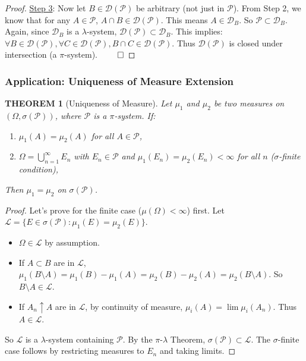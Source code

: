 \documentclass[12pt]{article}
\theoremstyle{blueplain}
\newtheorem{theorem}{THEOREM}[section]
\theoremstyle{bluedef}
\theoremstyle{blueremark}
\numberwithin{equation}{section}
\begin{document}
\begin{proof}
  \underline{Step 3}: Now let $B \in \mathcal{D}(\mathcal{P})$ be arbitrary (not just in $\mathcal{P}$).
  From Step 2, we know that for any $A \in \mathcal{P}$, $A \cap B \in \mathcal{D}(\mathcal{P})$.
  This means $A \in \mathcal{D}_B$. So $\mathcal{P} \subset \mathcal{D}_B$.
  Again, since $\mathcal{D}_B$ is a $\lambda$-system, $\mathcal{D}(\mathcal{P}) \subset \mathcal{D}_B$.
  This implies: $\forall B \in \mathcal{D}(\mathcal{P}), \forall C \in \mathcal{D}(\mathcal{P}), B \cap C \in \mathcal{D}(\mathcal{P})$.
  Thus $\mathcal{D}(\mathcal{P})$ is closed under intersection (a $\pi$-system). $\qed$
\end{proof}

\subsubsection{Application: Uniqueness of Measure Extension}

\begin{theorem}[Uniqueness of Measure]
  Let $\mu_1$ and $\mu_2$ be two measures on $(\Omega, \sigma(\mathcal{P}))$, where $\mathcal{P}$ is a $\pi$-system.
  If:
  \begin{enumerate}
    \item $\mu_1(A) = \mu_2(A)$ for all $A \in \mathcal{P}$,
    \item $\Omega = \bigcup_{n=1}^\infty E_n$ with $E_n \in \mathcal{P}$ and $\mu_1(E_n) = \mu_2(E_n) < \infty$ for all $n$ ($\sigma$-finite condition),
  \end{enumerate}
  Then $\mu_1 = \mu_2$ on $\sigma(\mathcal{P})$.
\end{theorem}

\begin{proof}
  Let's prove for the finite case ($\mu(\Omega) < \infty$) first.
  Let $\mathcal{L} = \{ E \in \sigma(\mathcal{P}) : \mu_1(E) = \mu_2(E) \}$.
  \begin{itemize}
    \item $\Omega \in \mathcal{L}$ by assumption.
    \item If $A \subset B$ are in $\mathcal{L}$, $\mu_1(B \setminus A) = \mu_1(B) - \mu_1(A) = \mu_2(B) - \mu_2(A) = \mu_2(B \setminus A)$. So $B \setminus A \in \mathcal{L}$.
    \item If $A_n \uparrow A$ are in $\mathcal{L}$, by continuity of measure, $\mu_i(A) = \lim \mu_i(A_n)$. Thus $A \in \mathcal{L}$.
  \end{itemize}
  So $\mathcal{L}$ is a $\lambda$-system containing $\mathcal{P}$. By the $\pi$-$\lambda$ Theorem, $\sigma(\mathcal{P}) \subset \mathcal{L}$.
  The $\sigma$-finite case follows by restricting measures to $E_n$ and taking limits.
\end{proof}
\end{document}

